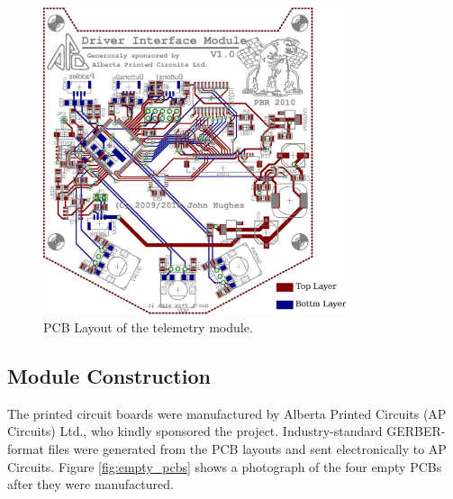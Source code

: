 \begin{figure}[H]
  \centering
  \includegraphics[width=3.5in,keepaspectratio]{implementation/figures/driver_interface_layout.eps}
  \caption{PCB Layout of the telemetry module.}
  \label{fig:driver_interface_layout}
\end{figure}

\subsection{Module Construction}

The printed circuit boards were manufactured by Alberta Printed Circuits (AP Circuits) Ltd., who kindly sponsored the project. Industry-standard GERBER-format files were generated from the PCB layouts and sent electronically to AP Circuits. Figure \ref{fig:empty_pcbs} shows a photograph of the four empty PCBs after they were manufactured.

